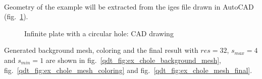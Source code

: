 \paragraph{}
Geometry of the example will be extracted from the iges file drawn in AutoCAD (fig.~\ref{qdt_fig:ex_chole_cad}).
    \begin{figure}[H]
        \centering
        \label{qdt_fig:ex_chole_cad}
        \caption{Infinite plate with a circular hole: CAD drawing}
    \end{figure}


Generated background mesh, coloring and the final result with $res=32$, $s_{max}=4$ and $s_{min}=1$ are shown in fig.~\ref{qdt_fig:ex_chole_background_mesh}, fig.~\ref{qdt_fig:ex_chole_mesh_coloring} and fig.~\ref{qdt_fig:ex_chole_mesh_final}.


